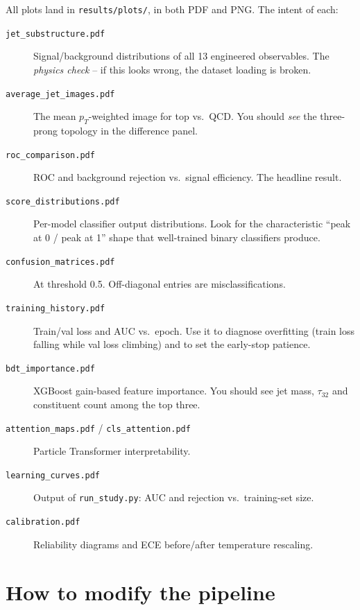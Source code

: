 \documentclass[11pt,a4paper]{article}
\begin{document}
All plots land in \texttt{results/plots/}, in both PDF and PNG. The
intent of each:
\begin{description}
    \item[\texttt{jet\_substructure.pdf}]\quad Signal/background
        distributions of all 13 engineered observables. The
        \emph{physics check} -- if this looks wrong, the dataset
        loading is broken.
    \item[\texttt{average\_jet\_images.pdf}]\quad The mean
        $p_T$-weighted image for top vs.\ QCD. You should
        \emph{see} the three-prong topology in the difference
        panel.
    \item[\texttt{roc\_comparison.pdf}]\quad ROC and background
        rejection vs.\ signal efficiency. The headline result.
    \item[\texttt{score\_distributions.pdf}]\quad Per-model
        classifier output distributions. Look for the
        characteristic ``peak at 0 / peak at 1'' shape that
        well-trained binary classifiers produce.
    \item[\texttt{confusion\_matrices.pdf}]\quad At threshold 0.5.
        Off-diagonal entries are misclassifications.
    \item[\texttt{training\_history.pdf}]\quad Train/val loss and
        AUC vs.\ epoch. Use it to diagnose overfitting (train
        loss falling while val loss climbing) and to set the
        early-stop patience.
    \item[\texttt{bdt\_importance.pdf}]\quad XGBoost gain-based
        feature importance. You should see jet mass, $\tau_{32}$
        and constituent count among the top three.
    \item[\texttt{attention\_maps.pdf} /
          \texttt{cls\_attention.pdf}]\quad Particle Transformer
        interpretability.
    \item[\texttt{learning\_curves.pdf}]\quad Output of
        \texttt{run\_study.py}: AUC and rejection vs.\ training-set
        size.
    \item[\texttt{calibration.pdf}]\quad Reliability diagrams and
        ECE before/after temperature rescaling.
\end{description}

\section{How to modify the pipeline}\label{sec:modify}
\end{document}
